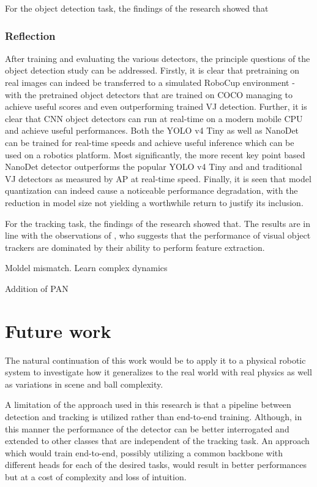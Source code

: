 \documentclass[a4paper,twoside,12pt]{report}
\begin{document}
For the object detection task, the findings of the research showed that


\subsubsection{Reflection}

After training and evaluating the various detectors, the principle questions of the object detection study can be addressed. Firstly, it is clear that pretraining on real images can indeed be transferred to a simulated RoboCup environment - with the pretrained object detectors that are trained on COCO managing to achieve useful scores and even outperforming trained VJ detection. Further, it is clear that CNN object detectors can run at real-time on a modern mobile CPU and achieve useful performances. Both the YOLO v4 Tiny as well as NanoDet can be trained for real-time speeds and achieve useful inference which can be used on a robotics platform. Most significantly, the more recent key point based NanoDet detector outperforms the popular YOLO v4 Tiny and and traditional VJ detectors as measured by AP at real-time speed. Finally, it is seen that model quantization can indeed cause a noticeable performance degradation, with the reduction in model size not yielding a worthwhile return to justify its inclusion. 

For the tracking task, the findings of the research showed that. The results are in line with the observations of \cite{diagnosingtrack}, who suggests that the performance of visual object trackers are dominated by their ability to perform feature extraction.

Moldel mismatch. Learn complex dynamics

Addition of PAN

\section{Future work}

The natural continuation of this work would be to apply it to a physical robotic system to investigate how it generalizes to the real world with real physics as well as variations in scene and ball complexity.

A limitation of the approach used in this research is that a pipeline between detection and tracking is utilized rather than end-to-end training. Although, in this manner the performance of the detector can be better interrogated and extended to other classes that are independent of the tracking task. An approach which would train end-to-end, possibly utilizing a common backbone with different heads for each of the desired tasks, would result in better performances but at a cost of complexity and loss of intuition.
\end{document}
